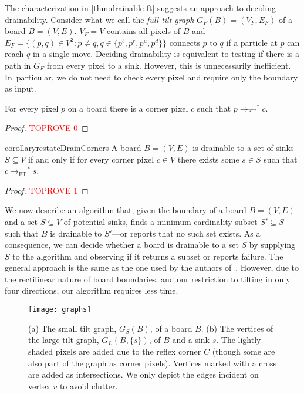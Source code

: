 \documentclass[a4paper,UKenglish,cleveref,thm-restate]{lipics-v2021}
\newcommand{\FT}{\ensuremath{\mathrm{FT}}\xspace}
\newcommand{\rOne}[1][M]{\ensuremath{\rightarrow_{#1}}}
\newcommand{\rStar}[1][M]{\rOne[#1]^*}
\begin{document}
The characterization in \cref{thm:drainable-ft} suggests an approach to
deciding drainability. Consider what we call the \emph{full tilt graph}
$G_F(B)=(V_F, E_F)$ of a board $B=(V,E)$. $V_F=V$ contains all pixels of $B$ and
\(E_F=\{(p,q) \in V^2 : p \neq q, q \in \{p^{\ell}, p^r, p^u, p^d\}\}\) connects
$p$ to $q$ if a particle at $p$ can reach $q$ in a single move. Deciding
drainability is equivalent to testing if there is a path in $G_F$ from every pixel to a sink.
However, this is unnecessarily inefficient. In~particular, we do not need to check every pixel
and require only the boundary as input.

\begin{lemma}
    \label{lem:corners-reachable}
    For every pixel $p$ on a board there is a corner pixel $c$ such that \(p
    \rStar[\FT] c\).
\end{lemma}
\begin{proof}\textcolor{red}{TOPROVE 0}\end{proof}

\begin{restatable}{corollary}{restateDrainCorners}
    \label{cor:drainable-ft-corners}
    A board $B=(V,E)$ is drainable to a set of sinks $S \subseteq V$ if and only if
    for every corner pixel $c \in V$ there exists some $s \in S$ such that $c \rStar[\FT] s$.
\end{restatable}
\begin{proof}\textcolor{red}{TOPROVE 1}\end{proof}

We now describe an algorithm that, given the boundary of a board $B=(V,E)$ and
a set $S \subseteq V$ of potential sinks, finds a minimum-cardinality subset
$S' \subseteq S$ such that $B$ is drainable to $S'$---or reports that no such
set exists. As a consequence, we can decide whether a board is drainable to a
set $S$ by supplying $S$ to the algorithm and observing if it returns a subset
or reports failure. The general approach is the same as the one used by the
authors of~\cite{acchlo-draining2014}. However, due to the rectilinear nature of
board boundaries, and our restriction to tilting in only four directions, our
algorithm requires less time.

\begin{figure}[htb]
    \centering
    \texttt{[image: graphs]}\caption{(a) The small tilt graph, $G_S(B)$, of a board $B$. (b) The vertices of the large
    tilt graph, $G_L(B, \{s\})$, of $B$ and a sink $s$. The lightly-shaded pixels are added due to
    the reflex corner $C$ (though some are also part of the graph as corner
    pixels). Vertices marked with a cross are added as intersections. We only depict the
    edges incident on vertex $v$ to avoid clutter.}\label{fig:graphs}
\end{figure}
\end{document}
